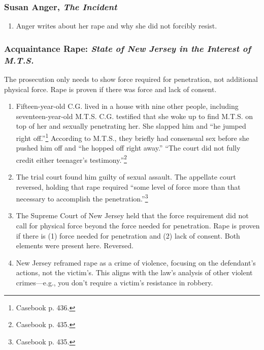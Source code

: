 \subsubsection{Susan Anger, \emph{The Incident}}

\begin{enumerate}
    \item Anger writes about her rape and why she did not forcibly resist.
\end{enumerate}

\subsubsection{Acquaintance Rape: \emph{State of New Jersey in the Interest of 
M.T.S.}}

The prosecution only needs to show force required for penetration, not 
additional physical force. Rape is proven if there was force and lack of 
consent.

\begin{enumerate}
    \item Fifteen-year-old C.G. lived in a house with nine other people, 
    including seventeen-year-old M.T.S. C.G. testified that she woke up to 
    find M.T.S. on top of her and sexually penetrating her. She slapped him 
    and ``he jumped right off.''\footnote{Casebook p. 436.} According to 
    M.T.S., they briefly had consensual sex before she pushed him off and 
    ``he hopped off right away.'' ``The court did not fully credit either 
    teenager's testimony.''\footnote{Casebook p. 435.}
    \item The trial court found him guilty of sexual assault. The appellate 
    court reversed, holding that rape required ``some level of force more than 
    that necessary to accomplish the penetration.''\footnote{Casebook p. 435.}
    \item The Supreme Court of New Jersey held that the force requirement did 
    not call for physical force beyond the force needed for penetration. Rape 
    is proven if there is (1) force needed for penetration and (2) lack of 
    consent. Both elements were present here. Reversed.
    \item New Jersey reframed rape as a crime of violence, focusing on the 
    defendant's actions, not the victim's. This aligns with the law's analysis 
    of other violent crimes---e.g., you don't require a victim's resistance in 
    robbery.
\end{enumerate}

